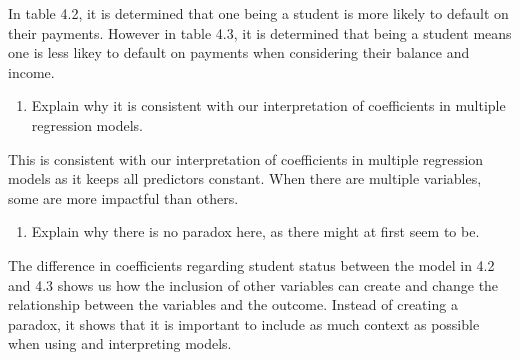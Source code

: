 \documentclass[
]{article}
\providecommand{\tightlist}{%
  \setlength{\itemsep}{0pt}\setlength{\parskip}{0pt}}
\begin{document}
In table 4.2, it is determined that one being a student is more likely
to default on their payments. However in table 4.3, it is determined
that being a student means one is less likey to default on payments when
considering their balance and income.

\begin{enumerate}
\def\labelenumi{\alph{enumi}.}
\setcounter{enumi}{1}
\tightlist
\item
  Explain why it is consistent with our interpretation of coefficients
  in multiple regression models.
\end{enumerate}

This is consistent with our interpretation of coefficients in multiple
regression models as it keeps all predictors constant. When there are
multiple variables, some are more impactful than others.

\begin{enumerate}
\def\labelenumi{\alph{enumi}.}
\setcounter{enumi}{2}
\tightlist
\item
  Explain why there is no paradox here, as there might at first seem to
  be.
\end{enumerate}

The difference in coefficients regarding student status between the
model in 4.2 and 4.3 shows us how the inclusion of other variables can
create and change the relationship between the variables and the
outcome. Instead of creating a paradox, it shows that it is important to
include as much context as possible when using and interpreting models.
\end{document}
